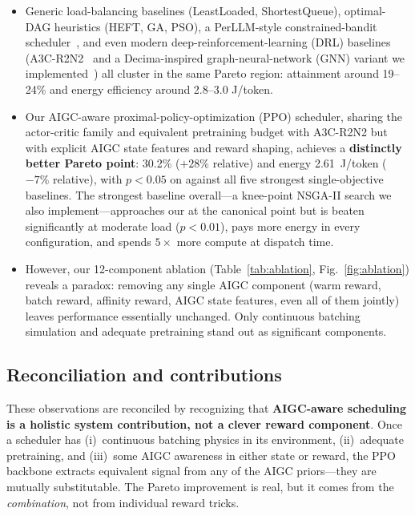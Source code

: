 \begin{itemize}
\item Generic load-balancing baselines (LeastLoaded,
  ShortestQueue), optimal-DAG heuristics (HEFT, GA, PSO),
  a PerLLM-style constrained-bandit
  scheduler~\cite{yang2024perllm}, and
  even modern deep-reinforcement-learning (DRL) baselines
  (A3C-R2N2~\cite{tuli2022a3cr2n} and
  a Decima-inspired graph-neural-network (GNN) variant we
  implemented~\cite{mao2019decima}) all cluster in the same
  Pareto region: \slo{} attainment
  around 19--24\% and energy
  efficiency around 2.8--3.0 J/token.

\item Our AIGC-aware proximal-policy-optimization (PPO)
  scheduler, sharing the actor-critic
  family and equivalent pretraining budget with A3C-R2N2 but
  with explicit AIGC state features and reward shaping, achieves
  a \textbf{distinctly better Pareto point}: \slo{} 30.2\%
  ($+28\%$ relative) and energy 2.61~J/token ($-7\%$ relative),
  with $p<0.05$ on \slo{} against all five strongest
  single-objective baselines. The strongest baseline
  overall---a knee-point NSGA-II search we also
  implement---approaches our \slo{} at the canonical point
  but is beaten significantly at moderate load ($p<0.01$),
  pays more energy in every configuration, and spends
  $5\times$ more compute at dispatch time.

\item However, our 12-component ablation
  (Table~\ref{tab:ablation}, Fig.~\ref{fig:ablation}) reveals a
  paradox: removing any single AIGC component (warm reward,
  batch reward, affinity reward, AIGC state features, even all
  of them jointly) leaves performance essentially unchanged.
  Only continuous batching simulation and adequate pretraining
  stand out as significant components.
\end{itemize}

\subsection{Reconciliation and contributions}

These observations are reconciled by recognizing that
\textbf{AIGC-aware scheduling is a holistic system contribution,
not a clever reward component}. Once a scheduler has
(i)~continuous batching physics in its environment,
(ii)~adequate pretraining, and (iii)~some AIGC
awareness in either state or reward, the PPO backbone extracts
equivalent signal from any of the AIGC priors---they are
mutually substitutable. The Pareto improvement is
real, but it comes from the \emph{combination}, not from
individual reward tricks.

